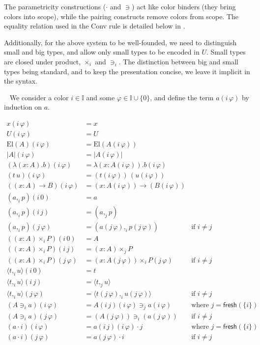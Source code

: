 \documentclass[english]{PaperTools/latex/lipics}
\newcommand\CP[3]{(#2,_{#1} #3)}
\newcommand\CTimes[2]{(#2) ×_{#1}}
\newcommand\op[1]{∋_{#1}}
\newcommand\fp[3]{⟨#2 ,_{#1} #3⟩}
\newcommand\mor[2]{({#1}\,{#2})}
\def\fresh#1{\mathsf{fresh}(#1)}
\def\El#1{\mathrm{El}(#1)}
\begin{document}
The parametricity constructions ($·$ and $∋$) act like color
binders (they bring colors into scope), while the pairing constructs
remove colors from scope.
The equality relation used in the {\sc Conv} rule is detailed below in .

Additionally, for the above system to be well-founded, we need to
distinguish small and big types, and allow only small types to be
encoded in $U$. Small types are closed under product, $×_i$ and
$∋_i$. The distinction between big and small types being standard, and
to keep the presentation concise, we leave it implicit in the syntax.

\begin{definition}~
  \label{def:color-erasure}
  We consider a color $i ∈ 𝕀$ and some $φ ∈ 𝕀 ∪ \{0\}$,
  and define the term $a(i\,φ)$ by induction on $a$.

\begin{align*}
  x \mor{i}{φ} & = x \\
  U \mor{i}{φ} & = U \\
  \El{A} \mor{i}{φ} & = \El {A\mor{i}{φ}} \\
  |A| \mor{i}{φ} & = |A\mor{i}{φ}| \\
  (λ(x:A).b)\mor{i}{φ} &= λ(x:A\mor{i}{φ}).b\mor{i}{φ} \\
  (t\,u)\mor{i}{φ} &= (t\mor{i}{φ}) \, (u\mor{i}{φ}) \\
  ((x:A)→B)\mor{i}{φ} &= (x:A\mor{i}{φ})→(B\mor{i}{φ}) \\
  {\CP {i} a p}\mor{i}{0} &= a \\
  {\CP {i} a p}\mor{i}{j} &= \CP {j} a p \\
  {\CP {i} a p}\mor{j}{φ} &= \CP {i} {a\mor{j}{φ}} {p\mor{j}{φ}} &\text{if $i ≠ j$} \\
  (\CTimes {i} {x:A} P)\mor{i}{0} &= A \\
  (\CTimes {i} {x:A} P)\mor{i}{j} &= \CTimes {j} {x:A} P \\
  (\CTimes {i} {x:A} P)\mor{j}{φ} &= \CTimes {i} {x:A\mor{j}{φ}} {P\mor{j}{φ}} &\text{if $i ≠ j$} \\
  {\fp {i} t u}\mor{i}{0} &= t \\
  {\fp {i} t u}\mor{i}{j} &= \fp {j} t u \\
  {\fp {i} t u}\mor{j}{φ} &= \fp {i} {t\mor{j}{φ}} {u\mor{j}{φ}} &\text{if $i ≠ j$} \\
  (A \op {i} a)\mor{i}{φ} &= {A\mor{i}{j}\mor{i}{φ}} \op {j} {a\mor{i}{φ}} &\text{where $j = \fresh{\{i\}}$} \\
  (A \op {i} a)\mor{j}{φ} &= (A\mor{j}{φ}) \op {i} (a\mor{j}{φ}) &\text{if $i ≠ j$} \\
%
  (a · i)\mor{i}{φ} &= a \mor{i}{j}\mor{i}{φ} · j &\text{where $j = \fresh{\{i\}}$} \\
  (a · i)\mor{j}{φ} &= a\mor{j}{φ} · i &\text{if $i ≠ j$} \\
  \end{align*}
\end{definition}
\end{document}
